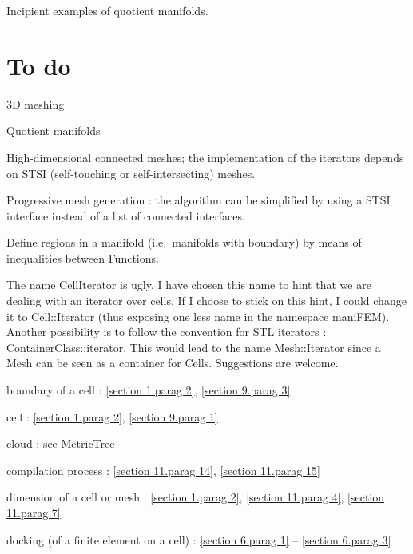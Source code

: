 \documentclass[a4paper]{scrreprt}
\def\numb{}
\newcommand\verm[1]{\textcolor{manif}{#1}}
\renewcommand\tt{\normalfont\ttfamily}
\begin{document}
\noindent Incipient examples of quotient manifolds.


\section*{To do}

\noindent 3D meshing

\noindent Quotient manifolds

\noindent High-dimensional connected meshes; the implementation of the iterators depends
on STSI (self-touching or self-intersecting) meshes.

\noindent Progressive mesh generation : the algorithm can be simplified by using
a STSI interface instead of a list of connected interfaces.

\noindent Define regions in a manifold (i.e.\ manifolds with boundary) by means of
inequalities between {\small\tt\verm{Function}}s.

\noindent The name {\small\tt\verm{CellIterator}} is ugly.
I have chosen this name to hint that we are dealing with an iterator over cells.
If I choose to stick on this hint, I could change it to {\small\tt\verm{Cell}::Iterator}
(thus exposing one less name in the {\small\tt namespace \verm{maniFEM}}).
Another possibility is to follow the convention for {\tt STL} iterators :
{\small\tt ContainerClass::iterator}.
This would lead to the name {\small\tt\verm{Mesh}::Iterator} since a {\small\tt\verm{Mesh}}
can be seen as a container for {\small\tt\verm{Cell}}s.
Suggestions are welcome.




\noindent
boundary of a cell : \ref{\numb section 1.\numb parag 2}, \ref{\numb section 9.\numb parag 3}

\noindent
cell : \ref{\numb section 1.\numb parag 2}, \ref{\numb section 9.\numb parag 1}

\noindent
cloud : see {\small\tt \verm{MetricTree}}

\noindent
compilation process : \ref{\numb section 11.\numb parag 14},
\ref{\numb section 11.\numb parag 15}

\noindent
dimension of a cell or mesh : \ref{\numb section 1.\numb parag 2},
\ref{\numb section 11.\numb parag 4}, \ref{\numb section 11.\numb parag 7}

\noindent
docking (of a finite element on a cell) :
\ref{\numb section 6.\numb parag 1} -- \ref{\numb section 6.\numb parag 3}
\end{document}
